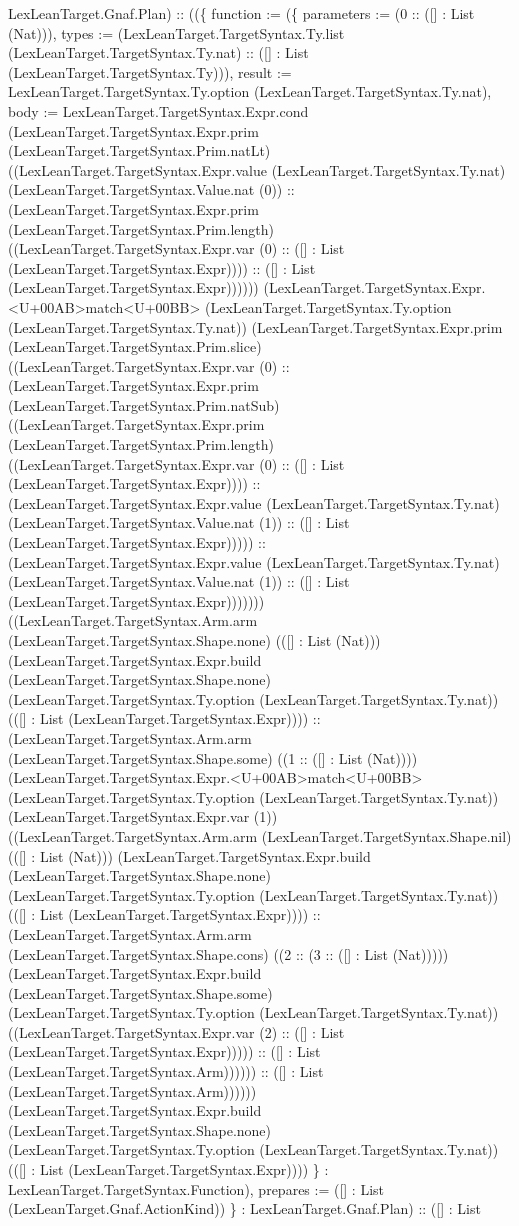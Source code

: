 \documentclass[11pt]{article}
\begin{document}
LexLeanTarget.Gnaf.Plan) :: ((\{ function := (\{ parameters := (0 :: ([] : List (Nat))), types := (LexLeanTarget.TargetSyntax.Ty.list (LexLeanTarget.TargetSyntax.Ty.nat) :: ([] : List (LexLeanTarget.TargetSyntax.Ty))), result := LexLeanTarget.TargetSyntax.Ty.option (LexLeanTarget.TargetSyntax.Ty.nat), body := LexLeanTarget.TargetSyntax.Expr.cond (LexLeanTarget.TargetSyntax.Expr.prim (LexLeanTarget.TargetSyntax.Prim.natLt) ((LexLeanTarget.TargetSyntax.Expr.value (LexLeanTarget.TargetSyntax.Ty.nat) (LexLeanTarget.TargetSyntax.Value.nat (0)) :: (LexLeanTarget.TargetSyntax.Expr.prim (LexLeanTarget.TargetSyntax.Prim.length) ((LexLeanTarget.TargetSyntax.Expr.var (0) :: ([] : List (LexLeanTarget.TargetSyntax.Expr)))) :: ([] : List (LexLeanTarget.TargetSyntax.Expr)))))) (LexLeanTarget.TargetSyntax.Expr.<U+00AB>match<U+00BB> (LexLeanTarget.TargetSyntax.Ty.option (LexLeanTarget.TargetSyntax.Ty.nat)) (LexLeanTarget.TargetSyntax.Expr.prim (LexLeanTarget.TargetSyntax.Prim.slice) ((LexLeanTarget.TargetSyntax.Expr.var (0) :: (LexLeanTarget.TargetSyntax.Expr.prim (LexLeanTarget.TargetSyntax.Prim.natSub) ((LexLeanTarget.TargetSyntax.Expr.prim (LexLeanTarget.TargetSyntax.Prim.length) ((LexLeanTarget.TargetSyntax.Expr.var (0) :: ([] : List (LexLeanTarget.TargetSyntax.Expr)))) :: (LexLeanTarget.TargetSyntax.Expr.value (LexLeanTarget.TargetSyntax.Ty.nat) (LexLeanTarget.TargetSyntax.Value.nat (1)) :: ([] : List (LexLeanTarget.TargetSyntax.Expr))))) :: (LexLeanTarget.TargetSyntax.Expr.value (LexLeanTarget.TargetSyntax.Ty.nat) (LexLeanTarget.TargetSyntax.Value.nat (1)) :: ([] : List (LexLeanTarget.TargetSyntax.Expr))))))) ((LexLeanTarget.TargetSyntax.Arm.arm (LexLeanTarget.TargetSyntax.Shape.none) (([] : List (Nat))) (LexLeanTarget.TargetSyntax.Expr.build (LexLeanTarget.TargetSyntax.Shape.none) (LexLeanTarget.TargetSyntax.Ty.option (LexLeanTarget.TargetSyntax.Ty.nat)) (([] : List (LexLeanTarget.TargetSyntax.Expr)))) :: (LexLeanTarget.TargetSyntax.Arm.arm (LexLeanTarget.TargetSyntax.Shape.some) ((1 :: ([] : List (Nat)))) (LexLeanTarget.TargetSyntax.Expr.<U+00AB>match<U+00BB> (LexLeanTarget.TargetSyntax.Ty.option (LexLeanTarget.TargetSyntax.Ty.nat)) (LexLeanTarget.TargetSyntax.Expr.var (1)) ((LexLeanTarget.TargetSyntax.Arm.arm (LexLeanTarget.TargetSyntax.Shape.nil) (([] : List (Nat))) (LexLeanTarget.TargetSyntax.Expr.build (LexLeanTarget.TargetSyntax.Shape.none) (LexLeanTarget.TargetSyntax.Ty.option (LexLeanTarget.TargetSyntax.Ty.nat)) (([] : List (LexLeanTarget.TargetSyntax.Expr)))) :: (LexLeanTarget.TargetSyntax.Arm.arm (LexLeanTarget.TargetSyntax.Shape.cons) ((2 :: (3 :: ([] : List (Nat))))) (LexLeanTarget.TargetSyntax.Expr.build (LexLeanTarget.TargetSyntax.Shape.some) (LexLeanTarget.TargetSyntax.Ty.option (LexLeanTarget.TargetSyntax.Ty.nat)) ((LexLeanTarget.TargetSyntax.Expr.var (2) :: ([] : List (LexLeanTarget.TargetSyntax.Expr))))) :: ([] : List (LexLeanTarget.TargetSyntax.Arm)))))) :: ([] : List (LexLeanTarget.TargetSyntax.Arm)))))) (LexLeanTarget.TargetSyntax.Expr.build (LexLeanTarget.TargetSyntax.Shape.none) (LexLeanTarget.TargetSyntax.Ty.option (LexLeanTarget.TargetSyntax.Ty.nat)) (([] : List (LexLeanTarget.TargetSyntax.Expr)))) \} : LexLeanTarget.TargetSyntax.Function), prepares := ([] : List (LexLeanTarget.Gnaf.ActionKind)) \} : LexLeanTarget.Gnaf.Plan) :: ([] : List 
\end{document}
